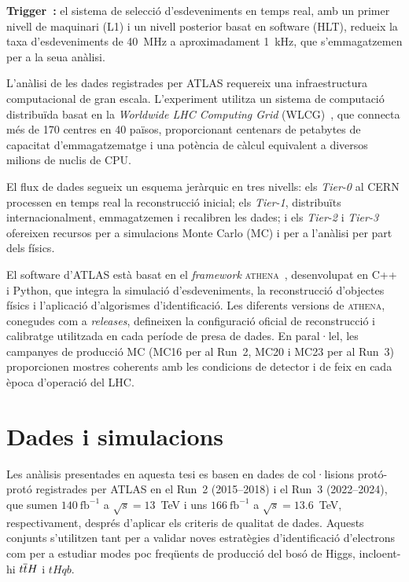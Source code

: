 \textbf{Trigger~\cite{trigger_run2}:} el sistema de selecció d’esdeveniments en temps real, amb un primer nivell de maquinari (L1) i un nivell posterior basat en software (HLT), redueix la taxa d’esdeveniments de 40~MHz a aproximadament 1~kHz, que s’emmagatzemen per a la seua anàlisi.  

L’anàlisi de les dades registrades per ATLAS requereix una infraestructura computacional de gran escala.  
L’experiment utilitza un sistema de computació distribuïda basat en la \textit{Worldwide LHC Computing Grid} (WLCG)~\cite{Bird:1695401}, que connecta més de 170 centres en 40 països, proporcionant centenars de petabytes de capacitat d’emmagatzematge i una potència de càlcul equivalent a diversos milions de nuclis de CPU.  

El flux de dades segueix un esquema jeràrquic en tres nivells: els \textit{Tier-0} al CERN processen en temps real la reconstrucció inicial; els \textit{Tier-1}, distribuïts internacionalment, emmagatzemen i recalibren les dades; i els \textit{Tier-2} i \textit{Tier-3} ofereixen recursos per a simulacions Monte Carlo (MC) i per a l’anàlisi per part dels físics.  

El software d’ATLAS està basat en el \textit{framework} \textsc{athena}~\cite{athena}, desenvolupat en C++ i Python, que integra la simulació d’esdeveniments, la reconstrucció d’objectes físics i l’aplicació d’algorismes d’identificació.  
Les diferents versions de \textsc{athena}, conegudes com a \textit{releases}, defineixen la configuració oficial de reconstrucció i calibratge utilitzada en cada període de presa de dades.  
En paral·lel, les campanyes de producció MC (MC16 per al Run~2, MC20 i MC23 per al Run~3) proporcionen mostres coherents amb les condicions de detector i de feix en cada època d’operació del LHC.

\section*{Dades i simulacions}

Les anàlisis presentades en aquesta tesi es basen en dades de col·lisions protó-protó registrades per ATLAS en el Run~2 (2015–2018) i el Run~3 (2022–2024), que sumen $140~\text{fb}^{-1}$ a $\sqrt{s}=13$~TeV i uns $166~\text{fb}^{-1}$ a $\sqrt{s}=13.6$~TeV, respectivament, després d’aplicar els criteris de qualitat de dades.  
Aquests conjunts s’utilitzen tant per a validar noves estratègies d’identificació d’electrons com per a estudiar modes poc freqüents de producció del bosó de Higgs, incloent-hi \(t\overline{t}H\) i \(tHqb\).  


